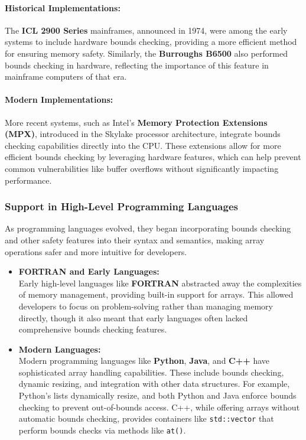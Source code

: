 \documentclass[12pt, oneside]{book}
\begin{document}
\paragraph{Historical Implementations:}
The \textbf{ICL 2900 Series} mainframes, announced in 1974, were among the early systems to include hardware bounds checking, providing a more efficient method for ensuring memory safety. Similarly, the \textbf{Burroughs B6500} also performed bounds checking in hardware, reflecting the importance of this feature in mainframe computers of that era.

\paragraph{Modern Implementations:}
More recent systems, such as Intel's \textbf{Memory Protection Extensions (MPX)}, introduced in the Skylake processor architecture, integrate bounds checking capabilities directly into the CPU. These extensions allow for more efficient bounds checking by leveraging hardware features, which can help prevent common vulnerabilities like buffer overflows without significantly impacting performance.

\subsubsection{Support in High-Level Programming Languages}
As programming languages evolved, they began incorporating bounds checking and other safety features into their syntax and semantics, making array operations safer and more intuitive for developers.

\begin{itemize}
	\item \textbf{FORTRAN and Early Languages:}\\
	Early high-level languages like \textbf{FORTRAN} abstracted away the complexities of memory management, providing built-in support for arrays. This allowed developers to focus on problem-solving rather than managing memory directly, though it also meant that early languages often lacked comprehensive bounds checking features.
	
	\item \textbf{Modern Languages:}\\
	Modern programming languages like \textbf{Python}, \textbf{Java}, and \textbf{C++} have sophisticated array handling capabilities. These include bounds checking, dynamic resizing, and integration with other data structures. For example, Python's lists dynamically resize, and both Python and Java enforce bounds checking to prevent out-of-bounds access. C++, while offering arrays without automatic bounds checking, provides containers like \texttt{std::vector} that perform bounds checks via methods like \texttt{at()}.
\end{itemize}
\end{document}
